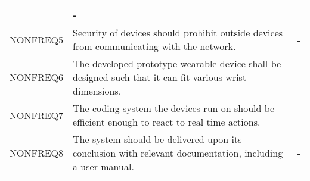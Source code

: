\begin{xltabular}[H]{1.4\textwidth}{p{0.2\textwidth} | p{0.5\textwidth} | p{0.8\textwidth}}
        &

        -\\

        \midrule

        NONFREQ5

        &

        Security of devices should prohibit outside devices from communicating with the network.

        &

        -\\

		\midrule

        NONFREQ6

        &

        The developed prototype wearable device shall be designed such that it can fit various wrist dimensions.

        &

        -\\

		\midrule

        NONFREQ7

        &

        The coding system the devices run on should be efficient enough to react to real time actions.

        &

        -\\

		\midrule

        NONFREQ8

        &

        The system should be delivered upon its conclusion with relevant documentation, including a user manual.

        &

        -\\

	\end{xltabular}
	\label{tbl:non_func_reqs_table}
